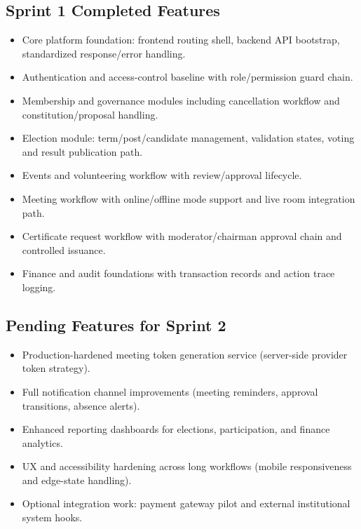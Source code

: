 \documentclass[12pt,a4paper]{article}
\begin{document}
\subsection{Sprint 1 Completed Features}

\begin{itemize}[noitemsep]
  \item Core platform foundation: frontend routing shell, backend API bootstrap, standardized response/error handling.
  \item Authentication and access-control baseline with role/permission guard chain.
  \item Membership and governance modules including cancellation workflow and constitution/proposal handling.
  \item Election module: term/post/candidate management, validation states, voting and result publication path.
  \item Events and volunteering workflow with review/approval lifecycle.
  \item Meeting workflow with online/offline mode support and live room integration path.
  \item Certificate request workflow with moderator/chairman approval chain and controlled issuance.
  \item Finance and audit foundations with transaction records and action trace logging.
\end{itemize}

\subsection{Pending Features for Sprint 2}

\begin{itemize}[noitemsep]
  \item Production-hardened meeting token generation service (server-side provider token strategy).
  \item Full notification channel improvements (meeting reminders, approval transitions, absence alerts).
  \item Enhanced reporting dashboards for elections, participation, and finance analytics.
  \item UX and accessibility hardening across long workflows (mobile responsiveness and edge-state handling).
  \item Optional integration work: payment gateway pilot and external institutional system hooks.
\end{itemize}
\end{document}
